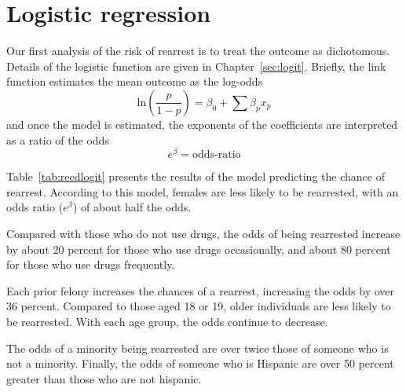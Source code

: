 \section{Logistic regression}

Our first analysis of the risk of rearrest is to treat the outcome as dichotomous.  Details of the logistic function are given in Chapter~\ref{sec:logit}.  Briefly, the link function estimates the mean outcome as the log-odds
\begin{equation}
\mbox{ln}\left(\frac{p}{1-p}\right)=\beta_0+\sum\beta_px_p
\end{equation}
and once the model is estimated, the exponents of the coefficients are interpreted as a ratio of the odds
\begin{equation}
e^{\beta}=\mbox{odds-ratio}
\end{equation}

Table~\ref{tab:recdlogit} presents the results of the model predicting the chance of rearrest.  According to this model, females are less likely to be rearrested, with an odds ratio ($e^\beta$) of about half the odds.

Compared with those who do not use drugs, the odds of being rearrested increase by about 20 percent for those who use drugs occasionally, and about 80 percent for those who use drugs frequently.

Each prior felony increases the chances of a rearrest, increasing the odds by over 36 percent. Compared to those aged 18 or 19, older individuals are less likely to be rearrested. With each age group, the odds continue to decrease.

The odds of a minority being rearrested are over twice those of someone who is not a minority.  Finally, the odds of someone who is Hispanic are over 50 percent greater than those who are not hispanic.

